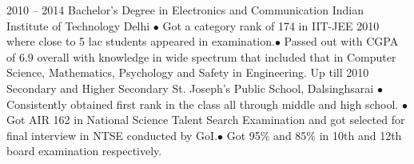 \documentclass[9pt]{developercv} %
\begin{document}


\begin{entrylist}
	\entry
		{2010 -- 2014}
		{Bachelor’s  Degree in Electronics and Communication}
		{Indian Institute of Technology Delhi}
		{$\bullet$ Got a category rank of 174 in IIT-JEE 2010 where close to 5 lac students appeared in examination.$\bullet$  Passed out with CGPA of 6.9 overall with knowledge in wide spectrum that included that in Computer Science, Mathematics, Psychology and Safety in Engineering.}
	\entry
		{Up till 2010}
		{Secondary and Higher Secondary}
		{St. Joseph's Public School, Dalsinghsarai}
		{$\bullet$ Consistently obtained first rank in the class all through middle and high school. $\bullet$ Got AIR 162 in National Science Talent Search Examination and got selected for final interview in NTSE conducted by GoI.$\bullet$  Got 95\% and 85\% in 10th and 12th board examination respectively. }

\end{entrylist}


%	
%	
%	
%	
%	
%	

\end{document}
